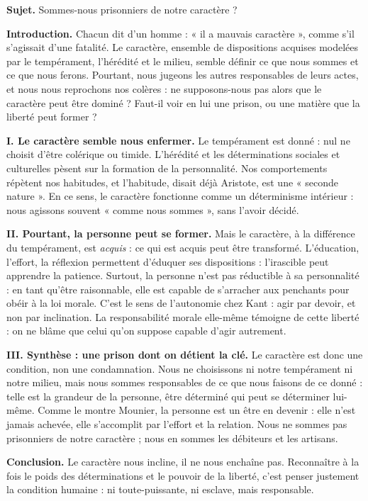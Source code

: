 \documentclass[11pt]{article}
\begin{document}
\begin{exoresolu}
\textbf{Sujet.} Sommes-nous prisonniers de notre caractère ?

\tcblower
\textbf{Introduction.} Chacun dit d'un homme : « il a mauvais caractère », comme s'il s'agissait d'une fatalité. Le caractère, ensemble de dispositions acquises modelées par le tempérament, l'hérédité et le milieu, semble définir ce que nous sommes et ce que nous ferons. Pourtant, nous jugeons les autres responsables de leurs actes, et nous nous reprochons nos colères : ne supposons-nous pas alors que le caractère peut être dominé ? Faut-il voir en lui une prison, ou une matière que la liberté peut former ?

\textbf{I. Le caractère semble nous enfermer.} Le tempérament est donné : nul ne choisit d'être colérique ou timide. L'hérédité et les déterminations sociales et culturelles pèsent sur la formation de la personnalité. Nos comportements répètent nos habitudes, et l'habitude, disait déjà Aristote, est une « seconde nature ». En ce sens, le caractère fonctionne comme un déterminisme intérieur : nous agissons souvent « comme nous sommes », sans l'avoir décidé.

\textbf{II. Pourtant, la personne peut se former.} Mais le caractère, à la différence du tempérament, est \emph{acquis} : ce qui est acquis peut être transformé. L'éducation, l'effort, la réflexion permettent d'éduquer ses dispositions : l'irascible peut apprendre la patience. Surtout, la personne n'est pas réductible à sa personnalité : en tant qu'être raisonnable, elle est capable de s'arracher aux penchants pour obéir à la loi morale. C'est le sens de l'autonomie chez Kant : agir par devoir, et non par inclination. La responsabilité morale elle-même témoigne de cette liberté : on ne blâme que celui qu'on suppose capable d'agir autrement.

\textbf{III. Synthèse : une prison dont on détient la clé.} Le caractère est donc une condition, non une condamnation. Nous ne choisissons ni notre tempérament ni notre milieu, mais nous sommes responsables de ce que nous faisons de ce donné : telle est la grandeur de la personne, être déterminé qui peut se déterminer lui-même. Comme le montre Mounier, la personne est un être en devenir : elle n'est jamais achevée, elle s'accomplit par l'effort et la relation. Nous ne sommes pas prisonniers de notre caractère ; nous en sommes les débiteurs et les artisans.

\textbf{Conclusion.} Le caractère nous incline, il ne nous enchaîne pas. Reconnaître à la fois le poids des déterminations et le pouvoir de la liberté, c'est penser justement la condition humaine : ni toute-puissante, ni esclave, mais responsable.
\end{exoresolu}
\end{document}
